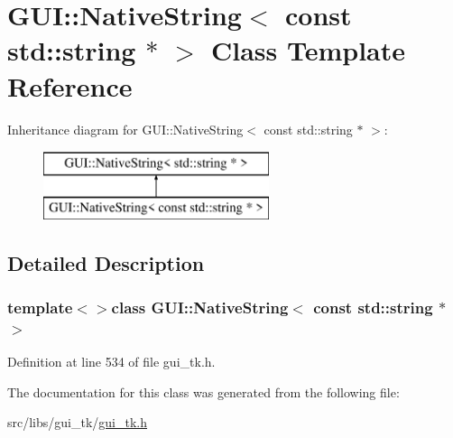 \hypertarget{classGUI_1_1NativeString_3_01const_01std_1_1string_01_5_01_4}{\section{G\-U\-I\-:\-:Native\-String$<$ const std\-:\-:string $\ast$ $>$ Class Template Reference}
\label{classGUI_1_1NativeString_3_01const_01std_1_1string_01_5_01_4}
}
Inheritance diagram for G\-U\-I\-:\-:Native\-String$<$ const std\-:\-:string $\ast$ $>$\-:\begin{figure}[H]
\begin{center}
\leavevmode
\includegraphics[height=2.000000cm]{classGUI_1_1NativeString_3_01const_01std_1_1string_01_5_01_4}
\end{center}
\end{figure}


\subsection{Detailed Description}
\subsubsection*{template$<$$>$class G\-U\-I\-::\-Native\-String$<$ const std\-::string $\ast$ $>$}



Definition at line 534 of file gui\-\_\-tk.\-h.



The documentation for this class was generated from the following file\-:\begin{DoxyCompactItemize}
\item 
src/libs/gui\-\_\-tk/\hyperlink{gui__tk_8h}{gui\-\_\-tk.\-h}\end{DoxyCompactItemize}
